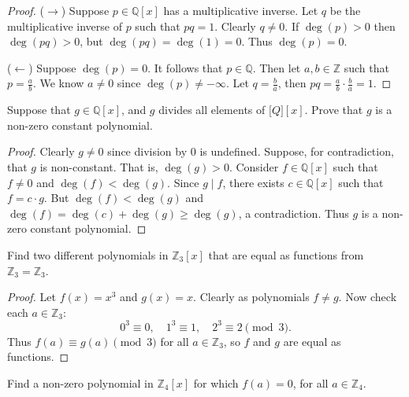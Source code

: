 \begin{proof}
    ($\rightarrow$) Suppose $p \in \mathbb{Q}[x]$ has a multiplicative inverse.
    Let $q$ be the multiplicative inverse of $p$ such that $p q = 1$.
    Clearly $q \ne 0$.
    If $\deg(p) > 0$ then $\deg(pq) > 0$, but $\deg(pq) = \deg(1) = 0$.
    Thus $\deg(p) = 0$.

    ($\leftarrow$) Suppose $\deg(p) = 0$. It follows that $p \in \mathbb{Q}$.
    Then let $a, b \in \mathbb{Z}$ such that $p = \frac{a}{b}$.
    We know $a \ne 0$ since $\deg(p) \ne -\infty$.
    Let $q = \frac{b}{a}$, then $p q = \frac{a}{b} \cdot \frac{b}{a} = 1$.
\end{proof}

\begin{tcolorbox}[title=Problem 11, breakable]
    Suppose that $g \in \mathbb{Q}[x]$, and $g$ divides all elements 
    of $\mathbb[Q][x]$. Prove that $g$ is a non-zero constant polynomial.
\end{tcolorbox}

\begin{proof}
    Clearly $g \ne 0$ since division by $0$ is undefined.  
    Suppose, for contradiction, that $g$ is non-constant. That is, $\deg(g) > 0$.  
    Consider $f \in \mathbb{Q}[x]$ such that $f \ne 0$ and $\deg(f) < \deg(g)$.
    Since $g \mid f$, there exists $c \in \mathbb{Q}[x]$ such that 
        $f = c \cdot g$.
    But $\deg(f) < \deg(g)$ and $\deg(f) = \deg(c) + \deg(g) \ge \deg(g)$,
        a contradiction.  
    Thus $g$ is a non-zero constant polynomial.
\end{proof}

\begin{tcolorbox}[title=Problem 12, breakable]
    Find two different polynomials in $\mathbb{Z}_3[x]$ that are equal 
    as functions from $\mathbb{Z}_3 = \mathbb{Z}_3$.
\end{tcolorbox}

\begin{proof}
    Let $f(x) = x^3$ and $g(x) = x$.
    Clearly as polynomials $f \ne g$.
    Now check each $a \in \mathbb{Z}_3$:
    \[
    0^3 \equiv 0, \quad 1^3 \equiv 1, \quad 2^3 \equiv 2 \pmod{3}.
    \]
    Thus $f(a) \equiv g(a) \pmod{3}$ for all $a \in \mathbb{Z}_3$, so $f$ and $g$ are equal as functions.
\end{proof}

\begin{tcolorbox}[title=Problem 13, breakable]
    Find a non-zero polynomial in $\mathbb{Z}_4[x]$ for which $f(a) = 0$,
    for all $a \in \mathbb{Z}_4$.
\end{tcolorbox}


